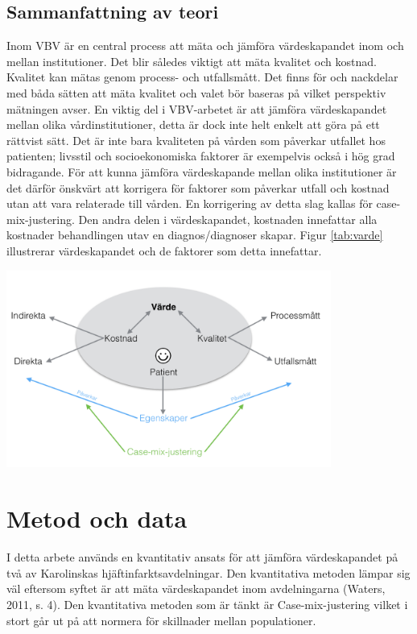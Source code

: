 \subsection{Sammanfattning av teori}

Inom VBV är en central process att mäta och jämföra värdeskapandet inom och mellan institutioner. Det blir således viktigt att mäta kvalitet och kostnad. Kvalitet kan mätas genom process- och utfallsmått. Det finns för och nackdelar med båda sätten att mäta kvalitet och valet bör baseras på vilket perspektiv mätningen avser. En viktig del i VBV-arbetet är att jämföra värdeskapandet mellan olika vårdinstitutioner, detta är dock inte helt enkelt att göra på ett rättvist sätt. Det är inte bara kvaliteten på vården som påverkar utfallet hos patienten; livsstil och socioekonomiska faktorer är exempelvis också i hög grad bidragande. För att kunna jämföra värdeskapande mellan olika institutioner är det därför önskvärt att korrigera för faktorer som påverkar utfall och kostnad utan att vara relaterade till vården. En korrigering av detta slag kallas för case-mix-justering. Den andra delen i värdeskapandet, kostnaden innefattar alla kostnader behandlingen utav en diagnos/diagnoser skapar. Figur \ref{tab:varde} illustrerar värdeskapandet och de faktorer som detta innefattar.

\noindent\begin{minipage}{\textwidth}
\centering
\includegraphics[width=0.8\textwidth]{varde}
\label{tab:varde}            
\end{minipage}

\section{Metod och data}

I detta arbete används en kvantitativ ansats för att jämföra värdeskapandet på två av Karolinskas hjäftinfarktsavdelningar. Den kvantitativa metoden lämpar sig väl eftersom syftet är att mäta värdeskapandet inom avdelningarna (Waters, 2011, s. 4). Den kvantitativa metoden som är tänkt är Case-mix-justering vilket i stort går ut på att normera för skillnader mellan populationer. 

